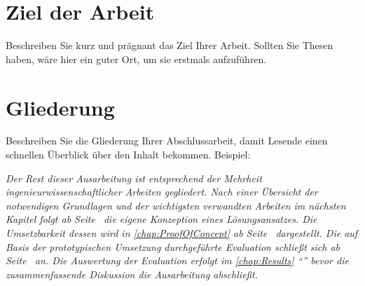 \section{Ziel der Arbeit}\label{sec:Intro:Goal}
Beschreiben Sie kurz und prägnant das Ziel Ihrer Arbeit. Sollten Sie Thesen haben, wäre hier ein guter Ort, um sie erstmals aufzuführen.


\section{Gliederung}\label{sec:Intro:Structure}
Beschreiben Sie die Gliederung Ihrer Abschlussarbeit, damit Lesende einen schnellen Überblick über den Inhalt bekommen. Beispiel:

\emph{Der Rest dieser Ausarbeitung ist entsprechend der Mehrheit ingenieurwissenschaftlicher Arbeiten gegliedert. Nach einer Übersicht der notwendigen Grundlagen und der wichtigsten verwandten Arbeiten im nächsten Kapitel folgt ab Seite~\pageref{chap:Concept} die eigene Konzeption eines Lösungsansatzes. Die Umsetzbarkeit dessen wird in \autoref{chap:ProofOfConcept} ab Seite~\pageref{chap:ProofOfConcept} dargestellt. Die auf Basis der prototypischen Umsetzung durchgeführte Evaluation schließt sich ab Seite~\pageref{chap:Evaluation} an. Die Auswertung der Evaluation erfolgt im \autoref{chap:Results} \enquote{} bevor die zusammenfassende Diskussion die Ausarbeitung abschließt.}